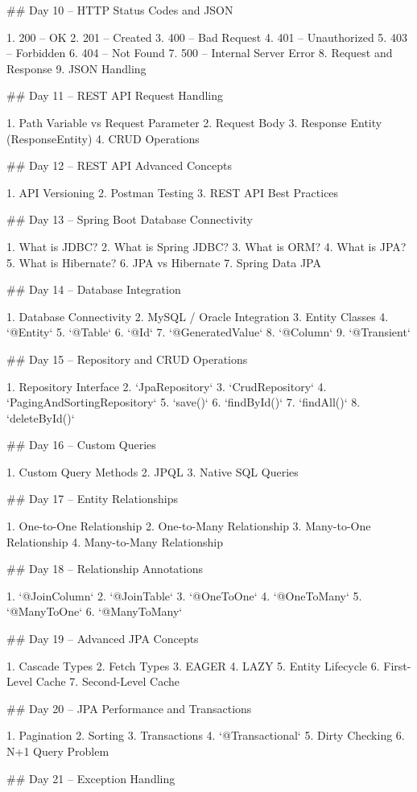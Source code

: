 ## Day 10 – HTTP Status Codes and JSON

1. 200 – OK
2. 201 – Created
3. 400 – Bad Request
4. 401 – Unauthorized
5. 403 – Forbidden
6. 404 – Not Found
7. 500 – Internal Server Error
8. Request and Response
9. JSON Handling

## Day 11 – REST API Request Handling

1. Path Variable vs Request Parameter
2. Request Body
3. Response Entity (ResponseEntity)
4. CRUD Operations

## Day 12 – REST API Advanced Concepts

1. API Versioning
2. Postman Testing
3. REST API Best Practices

## Day 13 – Spring Boot Database Connectivity

1. What is JDBC?
2. What is Spring JDBC?
3. What is ORM?
4. What is JPA?
5. What is Hibernate?
6. JPA vs Hibernate
7. Spring Data JPA

## Day 14 – Database Integration

1. Database Connectivity
2. MySQL / Oracle Integration
3. Entity Classes
4. `@Entity`
5. `@Table`
6. `@Id`
7. `@GeneratedValue`
8. `@Column`
9. `@Transient`

## Day 15 – Repository and CRUD Operations

1. Repository Interface
2. `JpaRepository`
3. `CrudRepository`
4. `PagingAndSortingRepository`
5. `save()`
6. `findById()`
7. `findAll()`
8. `deleteById()`

## Day 16 – Custom Queries

1. Custom Query Methods
2. JPQL
3. Native SQL Queries

## Day 17 – Entity Relationships

1. One-to-One Relationship
2. One-to-Many Relationship
3. Many-to-One Relationship
4. Many-to-Many Relationship

## Day 18 – Relationship Annotations

1. `@JoinColumn`
2. `@JoinTable`
3. `@OneToOne`
4. `@OneToMany`
5. `@ManyToOne`
6. `@ManyToMany`

## Day 19 – Advanced JPA Concepts

1. Cascade Types
2. Fetch Types
3. EAGER
4. LAZY
5. Entity Lifecycle
6. First-Level Cache
7. Second-Level Cache

## Day 20 – JPA Performance and Transactions

1. Pagination
2. Sorting
3. Transactions
4. `@Transactional`
5. Dirty Checking
6. N+1 Query Problem

## Day 21 – Exception Handling

